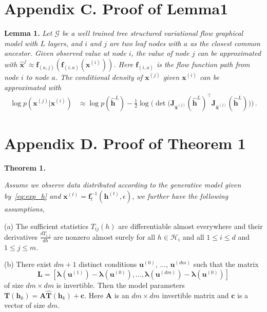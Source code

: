\documentclass{article} %
\begin{document}
\section*{Appendix C.  Proof of Lemma1}\label{appd:proof_lm1}
\textbf{Lemma 1.} {\it Let $\mathcal{G}$ be a well trained tree structured variational flow graphical model with $L$ layers, and $i$ and $j$ are two leaf nodes with $a$ as the closest common ancestor. Given observed value at node $i$, the value of node $j$ can be approximated with   $\widehat{\mathbf{x}}^{j} \approx  \mathbf{f}_{(a,j)}(\mathbf{f}_{(i, a)}(\mathbf{x}^{(i)}))$. Here $\mathbf{f}_{(i, a)}$ is the flow function path from node $i$ to node $a$. The conditional density of $\mathbf{x}^{(j)}$ given $\mathbf{x}^{(i)}$ can be approximated with 
\begin{align*} %
\log p(\mathbf{x}^{(j)} | \mathbf{x}^{(i)}) &\approx  \log p(\widehat{\mathbf{h}}^L) -  \frac{1}{2} \log \big(\det \big(\mathbf{J}_{\widehat{\mathbf{x}}^{(j)}}(\widehat{\mathbf{h}}^L)^\top\mathbf{J}_{\widehat{\mathbf{x}}^{(j)}}(\widehat{\mathbf{h}}^L)\big) \big) \, .
\end{align*}
}


\section*{Appendix D.  Proof of Theorem 1}\label{appd:proof_thm1}

\textbf{Theorem 1.} {\it Assume we observe data distributed according to the generative model given by~\eqref{eq:exp_h} and $\mathbf{x}^{(t)} = \mathbf{f}^{-1}_t(\mathbf{h}^{(t)}, \epsilon)$, we further have the following assumptions,

\vspace{0.05in}

(a) The sufficient statistics $T_{ij}(h)$ are differentiable almost everywhere and their derivatives $\frac{d T_{i,j}}{d h}$ are nonzero almost surely for all $h\in \mathcal{H}_i$ and all $1\leq i \leq d$ and $1 \leq j  \leq m$.

\vspace{0.05in}


(b) There exist $dm+1$ distinct conditions $\mathbf{u}^{(0)}$, ..., $\mathbf{u}^{(dm)}$  such that the matrix 
\begin{equation*} 
\mathbf{L} = [\mathbf{\lambda}(\mathbf{u}^{(1)}) - \mathbf{\lambda}(\mathbf{u}^{(0)}), ..., \mathbf{\lambda}(\mathbf{u}^{(dm)}) - \mathbf{\lambda}(\mathbf{u}^{(0)}) ]
\end{equation*} 
of size $dm \times dm$ is invertible.
Then the model parameters 
$\mathbf{T}(\mathbf{h}_k) = \mathbf{A}\widehat{\mathbf{T}}(\mathbf{h}_k) + \mathbf{c}.$ Here $\mathbf{A}$ is an $dm \times dm$ invertible matrix and $\mathbf{c}$ is a vector of size $dm$.
}
\end{document}
